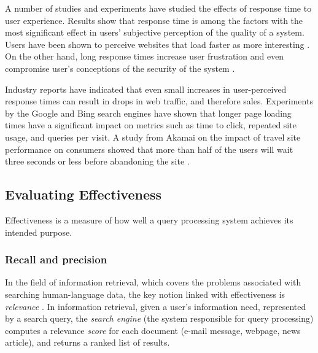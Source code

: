 A number of studies and experiments have studied the effects of response time to user experience.
Results show that response time is among the factors with the most significant effect in users' subjective perception
of the quality of a system.
Users have been shown to perceive websites that load faster as more interesting \cite{ramsay/retrievaltimesinvestigation}.
On the other hand, long response times increase user frustration \cite{ceaparu:userfrustration} and even compromise
user's conceptions of the security of the system \cite{bouch:qualityeyebeholder}.

Industry reports have indicated that even small increases in user-perceived response times can result in drops in web
traffic, and therefore sales.
Experiments by the Google and Bing search engines have shown that longer page loading times have a significant impact on
metrics such as time to click, repeated site usage, and queries per visit.
A study from Akamai on the impact of travel site performance on consumers showed that more than half of the users will
wait three seconds or less before abandoning the site \cite{akamai:travelsiteperformance}.

\subsection{Evaluating Effectiveness}

Effectiveness is a measure of how well a query processing system achieves its intended purpose.

\subsubsection{Recall and precision}

In the field of information retrieval, which covers the problems associated with searching human-language data,
the key notion linked with effectiveness is \textit{relevance} \cite{buttcher:informationretrieval}.
In information retrieval, given a user's information need, represented by a search query, the \textit{search engine}
(the system responsible for query processing) computes a relevance \textit{score} for each document (e-mail message,
webpage, news article), and returns a ranked list of results.

